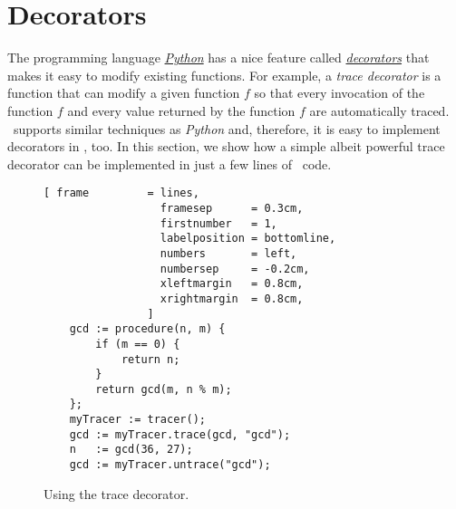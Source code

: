 \section{Decorators}
The programming language \href{https://www.python.org}{\textsl{Python}} has a nice feature called 
\href{http://en.wikipedia.org/wiki/Python_syntax_and_semantics#Decorators}{\emph{decorators}} that
makes it easy to modify existing functions.  For example, a \emph{trace decorator} is a function that can
modify a given function $f$ so that every invocation of the function $f$ and every value returned by
the function $f$ are automatically traced.  \setlx\ supports similar techniques as \textsl{Python} and,
therefore, it is easy to implement decorators in \setlx, too.  In this section, we show how a simple
albeit powerful trace decorator can be implemented in just a few lines of \setlx\ code.

\begin{figure}[!ht]
\centering
\begin{Verbatim}[ frame         = lines, 
                  framesep      = 0.3cm, 
                  firstnumber   = 1,
                  labelposition = bottomline,
                  numbers       = left,
                  numbersep     = -0.2cm,
                  xleftmargin   = 0.8cm,
                  xrightmargin  = 0.8cm,
                ]
    gcd := procedure(n, m) {
        if (m == 0) {
            return n;
        }
        return gcd(m, n % m);
    };
    myTracer := tracer();
    gcd := myTracer.trace(gcd, "gcd");
    n   := gcd(36, 27);
    gcd := myTracer.untrace("gcd");
\end{Verbatim}
\vspace*{-0.3cm}
\caption{Using the trace decorator.}
\label{fig:trace-decorator-use.stlx}
\end{figure}

